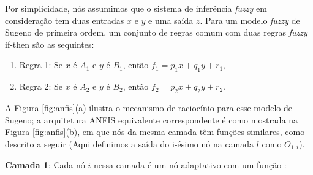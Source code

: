 Por simplicidade, nós assumimos que o sistema de inferência \textit{fuzzy} em consideração tem duas entradas $x$ e $y$ e uma saída $z$. Para um modelo \textit{fuzzy} de Sugeno de primeira ordem, um conjunto de regras comum com duas regras \textit{fuzzy} if-then são as sequintes:

\begin{enumerate}
\item Regra 1: Se $x$ é $A_1$ e $y$ é $B_1$, então $f_1 = p_1x + q_1y + r_1,$
\item Regra 2: Se $x$ é $A_2$ e $y$ é $B_2$, então $f_2 = p_2x + q_2y + r_2.$
\end{enumerate}

A Figura \ref{fig:anfis}(a) ilustra o mecanismo de raciocínio para esse modelo de Sugeno; a arquitetura ANFIS equivalente correspondente é como mostrada na Figura \ref{fig:anfis}(b), em que nós da mesma camada têm funções similares, como descrito a seguir (Aqui definimos a saída do i-ésimo nó na camada $l$ como $O_{1,i}$).

\textbf{Camada 1}: Cada nó $i$ nessa camada é um nó adaptativo com um função \label{symbol:anfis1}:

